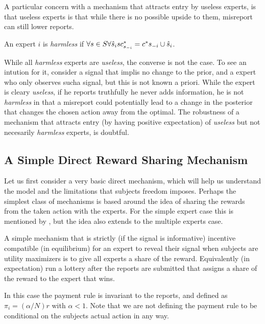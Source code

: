 A particular concern with a mechanism that attracts entry by useless experts, is that useless experts is that while there is no possible upside to them, misreport can still lower reports.

\begin{defn}\label{defn:harmless}
	An expert $i$ is \emph{harmless} if $\forall s \in S \and \forall \hat{s}_i s c^{*}_{s_{-i}} = c^{*}{s_{-i} \cup \hat{s}_i}$.
\end{defn}

While all \emph{harmless} experts are \emph{useless}, the converse is not the case. To see an intution for it, consider a signal that implis no change to the prior, and a expert who only observes sucha signal, but this is not known a priori. While the expert is cleary \emph{useless}, if he reports truthfully he never adds information, he is not \emph{harmless} in that a misreport could potentially lead to a change in the posterior that changes the chosen action away from the optimal.
The robustness of a mechanism that attracts entry (by having positive expectation) of \emph{useless} but not necesarily \emph{harmless}  experts, is doubtful.



\subsection{A Simple Direct Reward Sharing Mechanism}


Let us first consider a very basic direct mechanism, which will help us understand the model and the limitations that subjects freedom imposes. 
Perhaps the simplest class of mechanisms is based around the idea of sharing the rewards from the taken action with the experts. For the simple expert case this is mentioned by \cite{othman2010decision}, but the idea also extends to the multiple experts case. 

A simple mechanism that is strictly (if the signal is informative) incentive compatible (in equilibrium) for an expert to reveal their signal when subjects are utility maximizers is to give all experts a share of the reward. Equivalently (in expectation) run a lottery after the reports are submitted that assigns a share of the reward to the expert that wins. 

In this case the payment rule is invariant to the reports, and defined as $\pi_i  = (\alpha / N ) r $ with $\alpha < 1$. Note that we are not defining the payment rule to be conditional on the subjects actual action in any way. %



